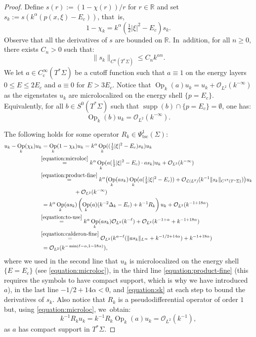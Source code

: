 \documentclass[10pt]{amsart}
\theoremstyle{plain}
\theoremstyle{definition}
\let\mc\mathcal
\newcommand{\R}{\mathbb{R}}
\DeclareMathOperator{\comp}{c}
\DeclareMathOperator{\Op}{Op}
\DeclareMathOperator{\supp}{supp}
\begin{document}
\begin{proof}
Define $s(r) \!:=\! (1-\chi(r))/r$ for $r \!\in\! \R$ and set $s_k \!:=\! s(k^\alpha(p(x,\xi)-E_c))$, that~is,
\[
1-\chi_k = k^\alpha (\tfrac{1}{2}|\xi|^2-E_c) s_k.
\]
Observe that all the derivatives of $s$ are bounded on $\R$. In~addition, for all $n \geq 0$, there exists $C_n > 0$ such that:
\begin{equation}
\label{equation:sk}
\|s_k\|_{C^n(T^*\Sigma)} \leq C_n k^{\alpha n}.
\end{equation}
We let $a \in C^\infty_{\comp}(T^*\Sigma)$ be a cutoff function such that $a \equiv 1$ on the energy layers $0 \leq E \leq 2 E_c$ and $a \equiv 0$ for $E > 3E_c$. Notice that $\Op_k(a)u_k = u_k + \mc{O}_{L^2}(k^{-\infty})$ as the eigenstates $u_k$ are microlocalized on the energy shell $\{p=E_c\}$. Equivalently, for all $b \in S^0(T^*\Sigma)$ such that $\supp(b) \cap \{p=E_c\}=\emptyset$, one has:
\begin{equation}
\label{equation:microloc}\Op_k(b)u_k = \mc{O}_{L^2}(k^{-\infty}).
\end{equation}

The following holds for some operator $R_k \in \Psi^1_{\mathrm{tsc}}(\Sigma)$:
\[
\begin{split}
u_k - \Op_k(\chi_k)u_k
& = \Op_k(1-\chi_k) u_k = k^\alpha \Op_k((\tfrac{1}{2}|\xi|^2-E_c)s_k) u_k \\ &
\mkern-7mu\overset{\eqref{equation:microloc}}{=} k^\alpha \Op_k(a(\tfrac{1}{2}|\xi|^2-E_c) \cdot a s_k) u_k + \mc{O}_{L^2}(k^{-\infty}) \\
& \mkern-7mu\overset{\eqref{equation:product-fine}}{=} k^\alpha \bigl(\Op_k(a s_k) \Op_k(a (\tfrac{1}{2}|\xi|^2-E_c)) + \mc{O}_{\mc{L}(L^2)}(k^{-1}\|s_k\|_{C^{17}(T^*\Sigma)})\bigr) u_k \\
& \hspace{2cm} + \mc{O}_{L^2}(k^{-\infty}) \\
& = k^{\alpha} \Op_k(a s_k) \left(\Op_k(a)(k^{-2}\Delta_k - E_c) + k^{-1} R_k\right) u_k + \mc{O}_{L^2}(k^{-1+18\alpha}) \\
& \mkern-7mu\overset{\eqref{equation:to-use}}{=} k^{\alpha} \Op_k(as_k) \mc{O}_{L^2}(k^{-\ell}) + \mc{O}_{L^2}(k^{-1+\alpha} + k^{-1+18\alpha}) \\
& \mkern-7mu\overset{\eqref{equation:calderon-fine}}{=} \mc{O}_{L^2}(k^{\alpha-\ell}(\|as_k\|_{L^\infty}+k^{-1/2+14\alpha}) +
k^{-1+18\alpha})\\
& = \mc{O}_{L^2}(k^{-\min(\ell-\alpha,1-18\alpha)}),
\end{split}
\]
where we used in the second line that $u_k$ is microlocalized on the energy
shell $\{E = E_c\}$ (see \eqref{equation:microloc}), in the third line \eqref{equation:product-fine}
(this requires the symbols to have compact support, which is why we have
introduced $a$), in the last line $-1/2+14\alpha < 0$, and \eqref{equation:sk} at each step to bound the derivatives of $s_k$. Also notice that $R_k$ is a pseudodifferential operator of order $1$ but, using \eqref{equation:microloc}, we~obtain:
\[
k^{-1} R_k u_k = k^{-1} R_k \Op_k(a) u_k = \mc{O}_{L^2}(k^{-1}),
\]
as $a$ has compact support in $T^*\Sigma$.
\end{proof}
\end{document}
